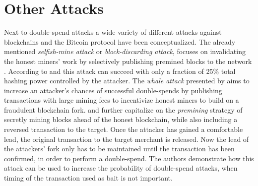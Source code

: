 \documentclass[a4paper,12pt,twoside]{report}
\begin{document}
\section{Other Attacks} \label{otherattacks}
Next to double-spend attacks a wide variety of different attacks against blockchains and the Bitcoin protocol have been conceptualized. The already mentioned \textit{selfish-mine attack} or \textit{block-discarding attack}, focuses on invalidating the honest miners' work by selectively publishing premined blocks to the network \cite{mwalemodel,selfishmine1,selfishmine2,lessThanHalfDraft}. According to \cite{lessThanHalfDraft} and \cite{selfishmine1} this attack can succeed with only a fraction of 25\% total hashing power controlled by the attacker. The \textit{whale attack} presented by \cite{whaleattack} aims to increase an attacker's chances of successful double-spends by publishing transactions with large mining fees to incentivize honest miners to build on a fraudulent blockchain fork. \cite{premining1} and \cite{premining2} further capitalize on the \textit{premining} strategy of secretly mining blocks ahead of the honest blockchain, while also including a reversed transaction to the target. Once the attacker has gained a comfortable lead, the original transaction to the target merchant is released. Now the lead of the attackers' fork only has to be maintained until the transaction has been confirmed, in order to perform a double-spend. The authors demonstrate how this attack can be used to increase the probability of double-spend attacks, when timing of the transaction used as bait is not important.
\end{document}
